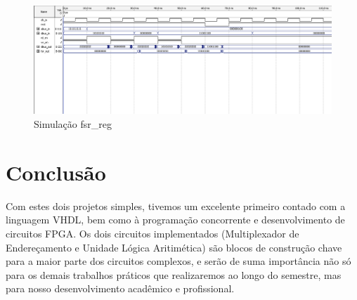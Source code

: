 \documentclass{article}
\begin{document}
\begin{figure}[ht]
    \begin{center}
        \includegraphics[width=15cm]{images/fsr_reg.png}
        \caption{Simulação fsr\_reg}
\end{center}
\end{figure}

\section{Conclusão}
Com estes dois projetos simples, tivemos um excelente primeiro contado com a linguagem VHDL, bem como à programação concorrente e desenvolvimento de circuitos FPGA. Os dois circuitos implementados (Multiplexador de Endereçamento e Unidade Lógica Aritimética) são blocos de construção chave para a maior parte dos circuitos complexos, e serão de suma importância não só para os demais trabalhos práticos que realizaremos ao longo do semestre, mas para nosso desenvolvimento acadêmico e profissional.
\end{document}
